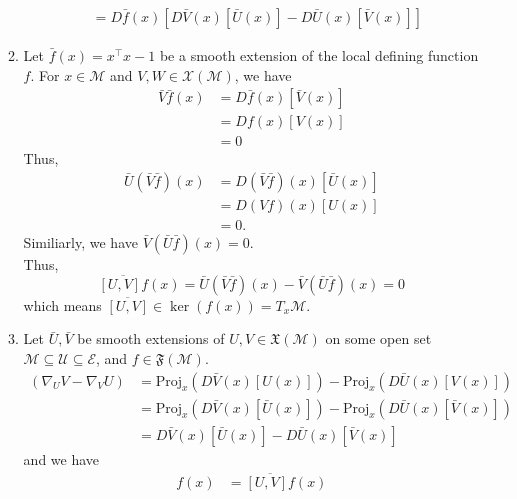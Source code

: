 \documentclass[en, oneside]{assignment}
\begin{document}
\begin{sol}
\begin{enumerate}[label=(\arabic*)]
\begin{enumerate}[label=(\alph*)]
\begin{align*}
                &= D \bar{f} (x) \left[D \bar{V} (x) [\bar{U} (x)] - D \bar{U} (x) [\bar{V} (x)]\right]
            \end{align*}
            \item Let $\bar{f} (x) = x ^\top x - 1$ be a smooth extension of the local defining function $f$.
            For $x \in \mathcal{M}$ and $V, W \in \mathcal{X} (\mathcal{M})$, we have
            \begin{align*}
                \bar{V} \bar{f} (x) &= D \bar{f} (x) [\bar{V} (x)]\\
                &= D f (x) [V(x)]\\
                &= 0
            \end{align*}
            Thus,
            \begin{align*}
                \bar{U} (\bar{V} \bar{f}) (x) &= D (\bar{V} \bar{f}) (x) [\bar{U} (x)]\\
                &= D (V f) (x) [U(x)]\\
                &= 0.
            \end{align*}
            Similiarly, we have $\bar{V} (\bar{U} \bar{f}) (x) = 0$.\\
            Thus,
            \begin{equation*}
                \overline{[U, V] f} (x) = \bar{U} (\bar{V} \bar{f}) (x) - \bar{V} (\bar{U} \bar{f}) (x) = 0
            \end{equation*}
            which means $\overline{[U, V]}\in \ker (f(x)) = T _x \mathcal{M}$.
            \item Let $\bar{U}, \bar{V}$ be smooth extensions of $U, V \in \mathfrak{X} (\mathcal{M})$ 
            on some open set $\mathcal{M} \subseteq \mathcal{U} \subseteq \mathcal{E}$, and $f \in \mathfrak{F} (\mathcal{M})$.
            \begin{align*}
                (\nabla _U V - \nabla _V U) &= \text{Proj} _x \left( D \bar{V} (x) [U (x)] \right) - \text{Proj} _x \left( D \bar{U} (x) [V (x)] \right)\\
                &= \text{Proj} _x \left( D \bar{V} (x) [\bar{U} (x)] \right) - \text{Proj} _x \left( D \bar{U} (x) [\bar{V} (x)] \right)\\
                &= D \bar{V} (x) [\bar{U} (x)] - D \bar{U} (x) [\bar{V} (x)]
            \end{align*}
            and we have
            \begin{align*}
                [U, V] f (x) &= \overline{[U, V] f} (x)\\

\end{align*}
\end{enumerate}
\end{enumerate}
\end{sol}
\end{document}
